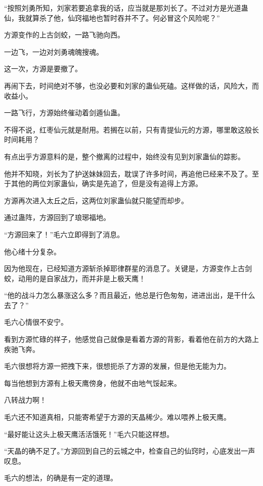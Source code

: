 
\begin{this_body}

“按照刘勇所知，刘家若要追拿我的话，应当就是那刘长了。不过对方是光道蛊仙，我就算杀了他，仙窍福地也暂时吞并不了。何必冒这个风险呢？”

方源变作的上古剑蛟，一路飞驰向西。

一边飞，一边对刘勇魂魄搜魂。

这一次，方源是要撤了。

再闹下去，时间绝对不够，也没必要和刘家的蛊仙死磕。这样做的话，风险大，而收益小。

一路飞行，方源始终催动着剑遁仙蛊。

不得不说，红枣仙元就是耐用。若搁在以前，只有青提仙元的方源，哪里敢这般长时间耗用？

有点出乎方源意料的是，整个撤离的过程中，始终没有见到刘家蛊仙的踪影。

他并不知晓，刘长为了护送妹妹回去，耽误了许多时间，再追他已经来不及了。至于其他的两位刘家蛊仙，确实是先追了，但是没有追得上方源。

方源再次进入太丘之后，这两位刘家蛊仙就只能望而却步。

通过蛊阵，方源回到了琅琊福地。

“方源回来了！”毛六立即得到了消息。

他心绪十分复杂。

因为他现在，已经知道方源斩杀掉耶律群星的消息了。关键是，方源变作上古剑蛟，动用的是自家战力，而并非是上极天鹰！

“他的战斗力怎么暴涨这么多？而且最近，他总是行色匆匆，进进出出，是干什么去了？”

毛六心情很不安宁。

看到方源忙碌的样子，他感觉自己就像是看着方源的背影，看着他在前方的大路上疾驰飞奔。

毛六很想将方源一把拽下来，很想扼杀了方源的发展，但是他无能为力。

每当他想到方源有上极天鹰傍身，他就不由地气馁起来。

八转战力啊！

毛六还不知道真相，只能寄希望于方源的天晶稀少。难以喂养上极天鹰。

“最好能让这头上极天鹰活活饿死！”毛六只能这样想。

“天晶的确不足了。”方源回到自己的云城之中，检查自己的仙窍时，心底发出一声叹息。

毛六的想法，的确是有一定的道理。


\end{this_body}
